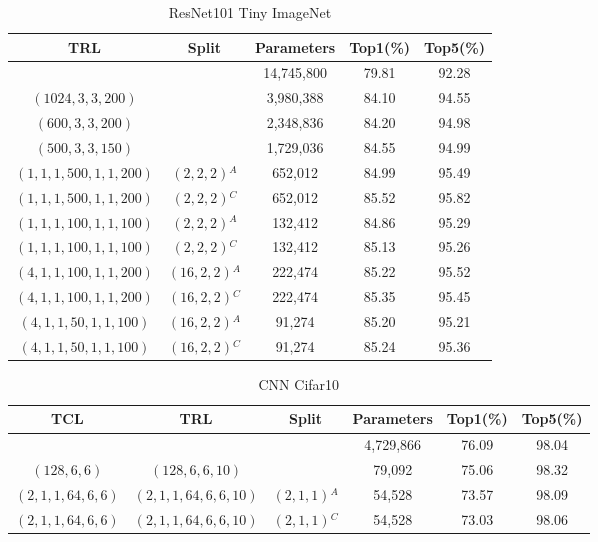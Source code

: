 \documentclass{article}
\begin{document}
	\begin{table}
		\centering
		\begin{tabular}{c c c c c}
			\hline
			\textbf{TRL} & \textbf{Split} & \textbf{Parameters} & \textbf{Top1(\%)} & \textbf{Top5(\%)} \\
			\hline
			& & 14,745,800 & 79.81 & 92.28 \\
			$(1024,3,3,200)$ & & 3,980,388 & 84.10 & 94.55 \\
			$(600,3,3,200)$ & & 2,348,836 & 84.20 & 94.98 \\
			$(500,3,3,150)$ & & 1,729,036 & 84.55 & 94.99 \\
			$(1,1,1,500,1,1,200)$ & $(2,2,2)$$^A$ & 652,012 & 84.99 & 95.49 \\
			$(1,1,1,500,1,1,200)$ & $(2,2,2)$$^C$ & 652,012 & 85.52 & 95.82 \\
			$(1,1,1,100,1,1,100)$ & $(2,2,2)$$^A$ & 132,412 & 84.86 & 95.29 \\
			$(1,1,1,100,1,1,100)$ & $(2,2,2)$$^C$ & 132,412 & 85.13 & 95.26 \\
			$(4,1,1,100,1,1,200)$ & $(16,2,2)$$^A$ & 222,474 & 85.22 & 95.52 \\
			$(4,1,1,100,1,1,200)$ & $(16,2,2)$$^C$ & 222,474 & 85.35 & 95.45 \\
			$(4,1,1,50,1,1,100)$ & $(16,2,2)$$^A$ & 91,274 & 85.20 & 95.21 \\
			$(4,1,1,50,1,1,100)$ & $(16,2,2)$$^C$ & 91,274 & 85.24 & 95.36 \\
			\hline
		\end{tabular}
		\caption{ResNet101 Tiny ImageNet}
		\label{tab:ResNet101 Tiny ImageNet}
	\end{table}
	
	
	\begin{table}
		\centering
		\begin{tabular}{c c c c c c}
			\hline
			\textbf{TCL} & \textbf{TRL} & \textbf{Split} & \textbf{Parameters} & \textbf{Top1(\%)} & \textbf{Top5(\%)} \\
			\hline
			& & & 4,729,866 & 76.09 & 98.04 \\
			$(128,6,6)$ & $(128,6,6,10)$ & & 79,092 & 75.06 & 98.32 \\
			$(2,1,1,64,6,6)$ & $(2,1,1,64,6,6,10)$ & $(2,1,1)$$^A$ & 54,528 & 73.57 & 98.09 \\
			$(2,1,1,64,6,6)$ & $(2,1,1,64,6,6,10)$ & $(2,1,1)$$^C$ & 54,528 & 73.03 & 98.06 \\
			\hline
		\end{tabular}
		\caption{CNN Cifar10}
		\label{tab:CNN Cifar10}
	\end{table}
	
\end{document}
